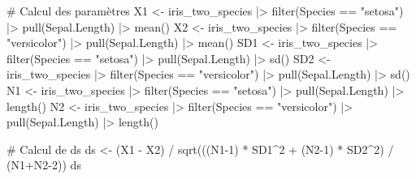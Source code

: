 \documentclass[
  letterpaper,
]{book}
\newenvironment{Shaded}{\begin{snugshade}}{\end{snugshade}}
\newcommand{\CommentTok}[1]{\textcolor[rgb]{0.37,0.37,0.37}{#1}}
\newcommand{\DecValTok}[1]{\textcolor[rgb]{0.68,0.00,0.00}{#1}}
\newcommand{\FunctionTok}[1]{\textcolor[rgb]{0.28,0.35,0.67}{#1}}
\newcommand{\NormalTok}[1]{\textcolor[rgb]{0.00,0.23,0.31}{#1}}
\newcommand{\OtherTok}[1]{\textcolor[rgb]{0.00,0.23,0.31}{#1}}
\newcommand{\SpecialCharTok}[1]{\textcolor[rgb]{0.37,0.37,0.37}{#1}}
\newcommand{\StringTok}[1]{\textcolor[rgb]{0.13,0.47,0.30}{#1}}
\begin{document}
\begin{Shaded}
\begin{Highlighting}[]
\CommentTok{\# Calcul des paramètres}
\NormalTok{X1 }\OtherTok{\textless{}{-}}\NormalTok{ iris\_two\_species }\SpecialCharTok{|\textgreater{}} \FunctionTok{filter}\NormalTok{(Species }\SpecialCharTok{==} \StringTok{"setosa"}\NormalTok{) }\SpecialCharTok{|\textgreater{}} \FunctionTok{pull}\NormalTok{(Sepal.Length) }\SpecialCharTok{|\textgreater{}} \FunctionTok{mean}\NormalTok{()}
\NormalTok{X2 }\OtherTok{\textless{}{-}}\NormalTok{ iris\_two\_species }\SpecialCharTok{|\textgreater{}} \FunctionTok{filter}\NormalTok{(Species }\SpecialCharTok{==} \StringTok{"versicolor"}\NormalTok{) }\SpecialCharTok{|\textgreater{}} \FunctionTok{pull}\NormalTok{(Sepal.Length) }\SpecialCharTok{|\textgreater{}} \FunctionTok{mean}\NormalTok{()}
\NormalTok{SD1 }\OtherTok{\textless{}{-}}\NormalTok{ iris\_two\_species }\SpecialCharTok{|\textgreater{}} \FunctionTok{filter}\NormalTok{(Species }\SpecialCharTok{==} \StringTok{"setosa"}\NormalTok{) }\SpecialCharTok{|\textgreater{}} \FunctionTok{pull}\NormalTok{(Sepal.Length) }\SpecialCharTok{|\textgreater{}} \FunctionTok{sd}\NormalTok{()}
\NormalTok{SD2 }\OtherTok{\textless{}{-}}\NormalTok{ iris\_two\_species }\SpecialCharTok{|\textgreater{}} \FunctionTok{filter}\NormalTok{(Species }\SpecialCharTok{==} \StringTok{"versicolor"}\NormalTok{) }\SpecialCharTok{|\textgreater{}} \FunctionTok{pull}\NormalTok{(Sepal.Length) }\SpecialCharTok{|\textgreater{}} \FunctionTok{sd}\NormalTok{()}
\NormalTok{N1 }\OtherTok{\textless{}{-}}\NormalTok{ iris\_two\_species }\SpecialCharTok{|\textgreater{}} \FunctionTok{filter}\NormalTok{(Species }\SpecialCharTok{==} \StringTok{"setosa"}\NormalTok{) }\SpecialCharTok{|\textgreater{}} \FunctionTok{pull}\NormalTok{(Sepal.Length) }\SpecialCharTok{|\textgreater{}} \FunctionTok{length}\NormalTok{()}
\NormalTok{N2 }\OtherTok{\textless{}{-}}\NormalTok{ iris\_two\_species }\SpecialCharTok{|\textgreater{}} \FunctionTok{filter}\NormalTok{(Species }\SpecialCharTok{==} \StringTok{"versicolor"}\NormalTok{) }\SpecialCharTok{|\textgreater{}} \FunctionTok{pull}\NormalTok{(Sepal.Length) }\SpecialCharTok{|\textgreater{}} \FunctionTok{length}\NormalTok{()}

\CommentTok{\# Calcul de ds}
\NormalTok{ds }\OtherTok{\textless{}{-}}\NormalTok{ (X1 }\SpecialCharTok{{-}}\NormalTok{ X2) }\SpecialCharTok{/} \FunctionTok{sqrt}\NormalTok{(((N1}\DecValTok{{-}1}\NormalTok{) }\SpecialCharTok{*}\NormalTok{ SD1}\SpecialCharTok{\^{}}\DecValTok{2} \SpecialCharTok{+}\NormalTok{ (N2}\DecValTok{{-}1}\NormalTok{) }\SpecialCharTok{*}\NormalTok{ SD2}\SpecialCharTok{\^{}}\DecValTok{2}\NormalTok{) }\SpecialCharTok{/}\NormalTok{ (N1}\SpecialCharTok{+}\NormalTok{N2}\DecValTok{{-}2}\NormalTok{))}
\NormalTok{ds}
\end{Highlighting}
\end{Shaded}
\end{document}
